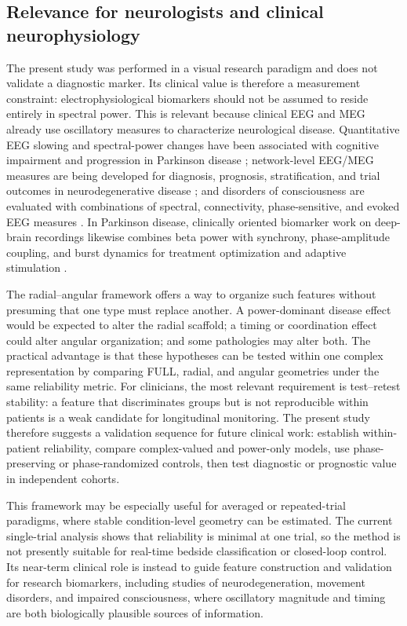 \documentclass[11pt]{article}
\begin{document}
\subsection{Relevance for neurologists and clinical neurophysiology}
The present study was performed in a visual research paradigm and does not validate a diagnostic marker. Its clinical value is therefore a measurement constraint: electrophysiological biomarkers should not be assumed to reside entirely in spectral power. This is relevant because clinical EEG and MEG already use oscillatory measures to characterize neurological disease. Quantitative EEG slowing and spectral-power changes have been associated with cognitive impairment and progression in Parkinson disease \citep{Geraedts2018}; network-level EEG/MEG measures are being developed for diagnosis, prognosis, stratification, and trial outcomes in neurodegenerative disease \citep{McMackin2019}; and disorders of consciousness are evaluated with combinations of spectral, connectivity, phase-sensitive, and evoked EEG measures \citep{Bai2021}. In Parkinson disease, clinically oriented biomarker work on deep-brain recordings likewise combines beta power with synchrony, phase-amplitude coupling, and burst dynamics for treatment optimization and adaptive stimulation \citep{Radcliffe2023}.

The radial--angular framework offers a way to organize such features without presuming that one type must replace another. A power-dominant disease effect would be expected to alter the radial scaffold; a timing or coordination effect could alter angular organization; and some pathologies may alter both. The practical advantage is that these hypotheses can be tested within one complex representation by comparing FULL, radial, and angular geometries under the same reliability metric. For clinicians, the most relevant requirement is test--retest stability: a feature that discriminates groups but is not reproducible within patients is a weak candidate for longitudinal monitoring. The present study therefore suggests a validation sequence for future clinical work: establish within-patient reliability, compare complex-valued and power-only models, use phase-preserving or phase-randomized controls, then test diagnostic or prognostic value in independent cohorts.

This framework may be especially useful for averaged or repeated-trial paradigms, where stable condition-level geometry can be estimated. The current single-trial analysis shows that reliability is minimal at one trial, so the method is not presently suitable for real-time bedside classification or closed-loop control. Its near-term clinical role is instead to guide feature construction and validation for research biomarkers, including studies of neurodegeneration, movement disorders, and impaired consciousness, where oscillatory magnitude and timing are both biologically plausible sources of information.
\end{document}

